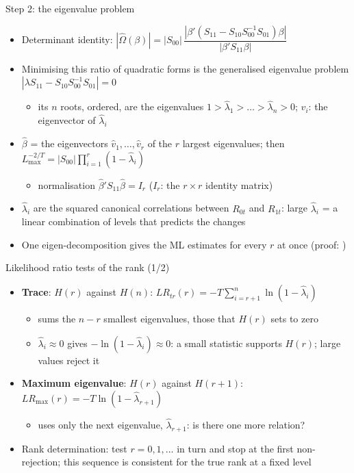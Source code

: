 \begin{frame}{Step 2: the eigenvalue problem}
\itemsize{\small}
\begin{itemize}
    \item Determinant identity: $|\hat\Omega(\beta)| = |S_{00}|\,\dfrac{|\beta'(S_{11} - S_{10}S_{00}^{-1}S_{01})\beta|}{|\beta'S_{11}\beta|}$
    \item Minimising this ratio of quadratic forms is the generalised eigenvalue problem $|\lambda S_{11} - S_{10}S_{00}^{-1}S_{01}| = 0$
    \begin{itemize}
        \item its $n$ roots, ordered, are the eigenvalues $1 > \hat\lambda_1 > \dots > \hat\lambda_n > 0$; $\hat v_i$: the eigenvector of $\hat\lambda_i$
    \end{itemize}
    \item $\hat\beta$ = the eigenvectors $\hat v_1, \dots, \hat v_r$ of the $r$ largest eigenvalues; then $L_{\max}^{-2/T} = |S_{00}|\prod_{i=1}^r(1 - \hat\lambda_i)$
    \begin{itemize}
        \item normalisation $\hat\beta'S_{11}\hat\beta = I_r$ ($I_r$: the $r\times r$ identity matrix)
    \end{itemize}
    \item $\hat\lambda_i$ are the squared canonical correlations between $R_{0t}$ and $R_{1t}$: large $\hat\lambda_i$ = a linear combination of levels that predicts the changes
    \item One eigen-decomposition gives the ML estimates for every $r$ at once (proof: )
\end{itemize}
\end{frame}

\begin{frame}{Likelihood ratio tests of the rank (1/2)}
\itemsize{\small}
\begin{itemize}
    \item \textbf{Trace}: $H(r)$ against $H(n)$: $LR_{tr}(r) = -T\sum_{i=r+1}^{n}\ln(1 - \hat\lambda_i)$
    \begin{itemize}
        \item sums the $n - r$ smallest eigenvalues, those that $H(r)$ sets to zero
        \item $\hat\lambda_i \approx 0$ gives $-\ln(1 - \hat\lambda_i) \approx 0$: a small statistic supports $H(r)$; large values reject it
    \end{itemize}
    \item \textbf{Maximum eigenvalue}: $H(r)$ against $H(r + 1)$: $LR_{\max}(r) = -T\ln(1 - \hat\lambda_{r+1})$
    \begin{itemize}
        \item uses only the next eigenvalue, $\hat\lambda_{r+1}$: is there one more relation?
    \end{itemize}
    \item Rank determination: test $r = 0, 1, \dots$ in turn and stop at the first non-rejection; this sequence is consistent for the true rank at a fixed level 
\end{itemize}
\end{frame}

